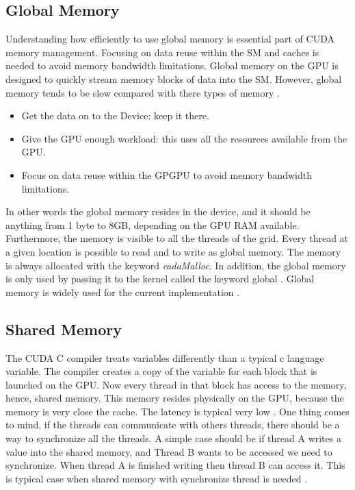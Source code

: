 \subsection{Global Memory}

Understanding how efficiently to use global memory is essential part of CUDA memory management. Focusing on data reuse within the SM and caches is needed to avoid memory bandwidth limitations. Global memory on the GPU is designed to quickly stream memory blocks of data into the SM. However, global memory tends to be slow compared with there types of memory \cite{design}.

\begin{itemize}
\item Get the data on to the Device: keep it there.
\item Give the GPU enough workload: this uses all the resources available from the GPU.
\item Focus on data reuse within the GPGPU to avoid memory bandwidth limitations.
\end{itemize}

In other words the global memory resides in the device, and it should be anything from 1 byte to 8GB, depending on the GPU RAM available. Furthermore, the memory is visible to all the threads of the grid. Every thread at a given location is possible to read and to write as global memory. The memory is always allocated with the keyword \textit{cadaMalloc}. In addition, the global memory is only used by passing it to the kernel called the keyword \twoline global \twoline. Global memory is widely used for the current implementation \cite{design}.

\subsection{Shared Memory}

The CUDA C compiler treats variables differently than a typical c language variable. The compiler creates a copy of the variable for each block that is launched on the GPU. Now every thread in that block has access to the memory, hence, shared memory. This memory resides physically on the GPU, because the memory is very close the cache. The latency is typical very low \cite{example}. One thing comes to mind, if the threads can communicate with others threads, there should be a way to synchronize all the threads. A simple case should be if thread A writes a value into the shared memory, and Thread B wants to be accessed we need to synchronize. When thread A is finished writing then thread B can access it. This is typical case when shared memory with synchronize thread is needed \cite{cook}.

